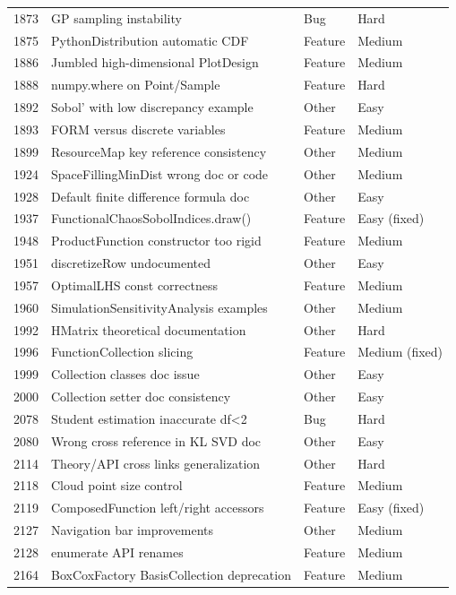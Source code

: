 \documentclass[a4paper,11pt]{article}
\begin{document}
\begin{longtable}{rp{8.4cm}ll}
1873 & GP sampling instability & Bug & Hard \\
1875 & PythonDistribution automatic CDF & Feature & Medium \\
1886 & Jumbled high-dimensional PlotDesign & Feature & Medium \\
1888 & numpy.where on Point/Sample & Feature & Hard \\
1892 & Sobol' with low discrepancy example & Other & Easy \\
1893 & FORM versus discrete variables & Feature & Medium \\
1899 & ResourceMap key reference consistency & Other & Medium \\
1924 & SpaceFillingMinDist wrong doc or code & Other & Medium \\
1928 & Default finite difference formula doc & Other & Easy \\
1937 & FunctionalChaosSobolIndices.draw() & Feature & Easy (fixed) \\
1948 & ProductFunction constructor too rigid & Feature & Medium \\
1951 & discretizeRow undocumented & Other & Easy \\
1957 & OptimalLHS const correctness & Feature & Medium \\
1960 & SimulationSensitivityAnalysis examples & Other & Medium \\
1992 & HMatrix theoretical documentation & Other & Hard \\
1996 & FunctionCollection slicing & Feature & Medium (fixed) \\
1999 & Collection classes doc issue & Other & Easy \\
2000 & Collection setter doc consistency & Other & Easy \\
2078 & Student estimation inaccurate df<2 & Bug & Hard \\
2080 & Wrong cross reference in KL SVD doc & Other & Easy \\
2114 & Theory/API cross links generalization & Other & Hard \\
2118 & Cloud point size control & Feature & Medium \\
2119 & ComposedFunction left/right accessors & Feature & Easy (fixed) \\
2127 & Navigation bar improvements & Other & Medium \\
2128 & enumerate API renames & Feature & Medium \\
2164 & BoxCoxFactory BasisCollection deprecation & Feature & Medium \\
\bottomrule
\end{longtable}
\normalsize
\end{document}
